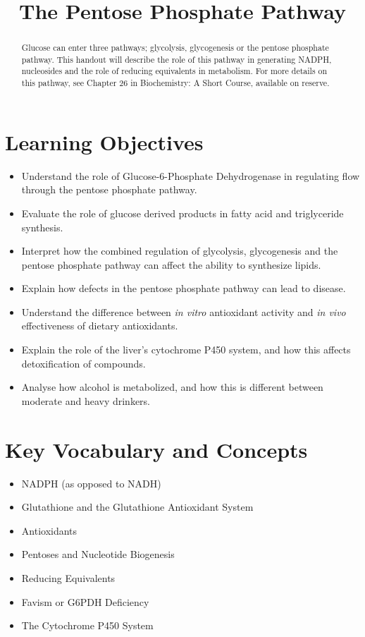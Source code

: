 \documentclass{tufte-handout}
\title{The Pentose Phosphate Pathway}
\author{}
\date{}  %
\begin{document}
\maketitle%

\begin{abstract}
\noindent Glucose can enter three pathways; glycolysis, glycogenesis or the pentose phosphate pathway.  This handout will describe the role of this pathway in generating NADPH, nucleosides and the role of reducing equivalents in metabolism.   For more details on this pathway, see Chapter 26 in Biochemistry: A Short Course, available on reserve\cite{Berg2015}.
\end{abstract}

\tableofcontents
\pagebreak
\section{Learning Objectives}

\begin{itemize}
\item Understand the role of Glucose-6-Phosphate Dehydrogenase in regulating flow through the pentose phosphate pathway.
\item Evaluate the role of glucose derived products in fatty acid and triglyceride synthesis.
\item Interpret how the combined regulation of glycolysis, glycogenesis and the pentose phosphate pathway can affect the ability to synthesize lipids.
\item Explain how defects in the pentose phosphate pathway can lead to disease.
\item Understand the difference between \textit{in vitro} antioxidant activity and \textit{in vivo} effectiveness of dietary antioxidants.
\item Explain the role of the liver's cytochrome P450 system, and how this affects detoxification of compounds.
\item Analyse how alcohol is metabolized, and how this is different between moderate and heavy drinkers.
\end{itemize}

\section{Key Vocabulary and Concepts}
\begin{itemize}
	\item NADPH (as opposed to NADH)
	\item Glutathione and the Glutathione Antioxidant System
	\item Antioxidants
	\item Pentoses and Nucleotide Biogenesis
	\item Reducing Equivalents
	\item Favism or G6PDH Deficiency
	\item The Cytochrome P450 System
\end{itemize}
\end{document}
